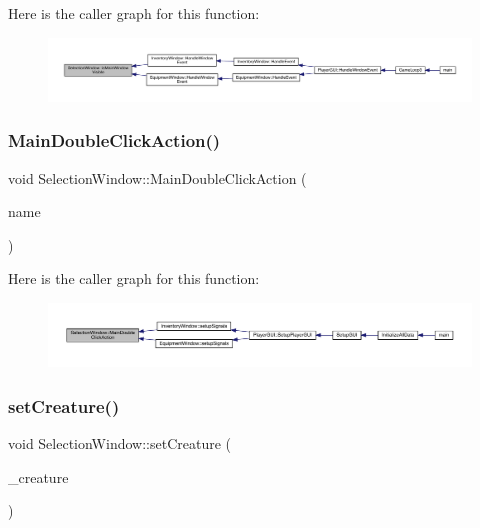 Here is the caller graph for this function\+:
\nopagebreak
\begin{figure}[H]
\begin{center}
\leavevmode
\includegraphics[width=350pt]{db/d9c/class_selection_window_a99e0308a6f3478e88e6d5554a59ddb12_icgraph}
\end{center}
\end{figure}
\mbox{\label{class_selection_window_aad256b3ad7d9dfef1465a3ca9bba6e5b}} 
\subsubsection{\texorpdfstring{Main\+Double\+Click\+Action()}{MainDoubleClickAction()}}
{\footnotesize\ttfamily void Selection\+Window\+::\+Main\+Double\+Click\+Action (\begin{DoxyParamCaption}\item[{std\+::string}]{name }\end{DoxyParamCaption})}

Here is the caller graph for this function\+:
\nopagebreak
\begin{figure}[H]
\begin{center}
\leavevmode
\includegraphics[width=350pt]{db/d9c/class_selection_window_aad256b3ad7d9dfef1465a3ca9bba6e5b_icgraph}
\end{center}
\end{figure}
\mbox{\label{class_selection_window_a870a261488489d8407da1cfacefa2724}} 
\subsubsection{\texorpdfstring{set\+Creature()}{setCreature()}}
{\footnotesize\ttfamily void Selection\+Window\+::set\+Creature (\begin{DoxyParamCaption}\item[{\mbox{\hyperlink{class_base_creature}{Base\+Creature}} $\ast$}]{\+\_\+creature }\end{DoxyParamCaption})}

